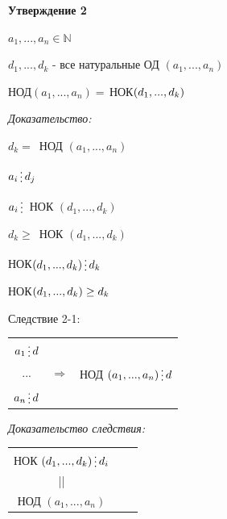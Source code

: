 \documentclass[12pt]{article}
\begin{document}
\textbf{Утверждение 2}\par
$a_1,...,a_n \in \mathbb{N}$\par
$d_1,...,d_k$ - все натуральные ОД $(a_1,...,a_n)$\par
НОД$(a_1,...,a_n)=\,$НОК$(d_1,...,d_k) \newline$\par
\textit{Доказательство:}\par
$d_k =\,$ НОД $(a_1,...,a_n)$\par
$a_i \mathop{\raisebox{-2pt}{\vdots}} d_j$\par
$a_i \mathop{\raisebox{-2pt}{\vdots}} \,$ НОК $(d_1,...,d_k)$\par
$d_k \geq \,$ НОК $(d_1,...,d_k)$\par
НОК$(d_1,...,d_k)\mathop{\raisebox{-2pt}{\vdots}} d_k$\par
НОК$(d_1,...,d_k) \geq d_k \newline$\par
Следствие 2-1:\par
\begin{tabular}{ccc}
    $a_1 \mathop{\raisebox{-2pt}{\vdots}} d$                                     \\
    ... & $\Rightarrow$ & НОД $(a_1,...,a_n) \mathop{\raisebox{-2pt}{\vdots}} d$ \\
    $a_n \mathop{\raisebox{-2pt}{\vdots}} d$                                     \\
\end{tabular}\par
\textit{Доказательство следствия:}\par
\begin{tabular}{ccc}
    НОК $(d_1,...,d_k) \mathop{\raisebox{-2pt}{\vdots}} d_i$ \\
    ||                                                       \\
    НОД $(a_1,...,a_n)$                                      \\
\end{tabular}\par
\end{document}
